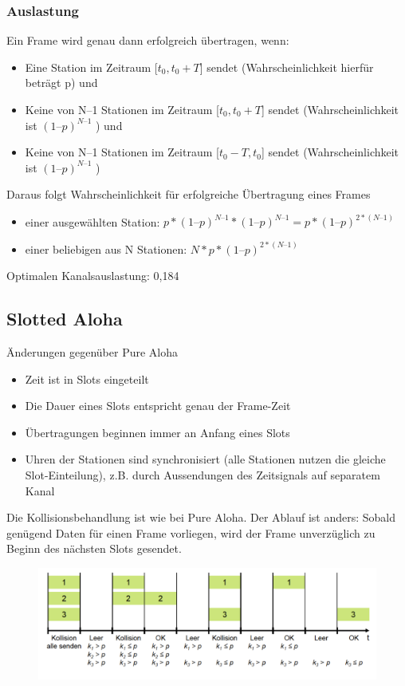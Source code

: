 \documentclass{article} %
\begin{document}
\subsubsection{Auslastung}
Ein Frame wird genau dann erfolgreich übertragen, wenn: 
	\begin{itemize}
	\item Eine Station im Zeitraum [$t_0,t_0+T$] sendet (Wahrscheinlichkeit hierfür beträgt p) und 
	\item Keine von N–1 Stationen im Zeitraum [$t_0,t_0+T$] sendet (Wahrscheinlichkeit ist $(1–p)^{N–1}$ ) und 
	\item Keine von N–1 Stationen im Zeitraum [$t_0-T,t_0$] sendet (Wahrscheinlichkeit ist $(1–p)^{N–1}$ )
	\end{itemize}
Daraus folgt Wahrscheinlichkeit für erfolgreiche Übertragung eines Frames 
	\begin{itemize}
	\item einer ausgewählten Station: $p*(1–p)^{N–1}*(1–p)^{N–1} = p*(1–p)^{2*(N–1)}$
	\item einer beliebigen aus N Stationen: $N*p*(1–p)^{2*(N–1)}$
	\end{itemize}
Optimalen Kanalsauslastung: 0,184


\subsection{Slotted Aloha}
Änderungen gegenüber Pure Aloha
	\begin{itemize}
	\item Zeit ist in Slots eingeteilt 
	\item Die Dauer eines Slots entspricht genau der Frame-Zeit 
	\item Übertragungen beginnen immer an Anfang eines Slots 
	\item Uhren der Stationen sind synchronisiert (alle Stationen nutzen die gleiche Slot-Einteilung), z.B. durch Aussendungen des Zeitsignals auf separatem Kanal 
	\end{itemize}
Die Kollisionsbehandlung ist wie bei Pure Aloha. Der Ablauf ist anders: Sobald genügend Daten für einen Frame vorliegen, wird der Frame unverzüglich zu Beginn des nächsten Slots gesendet.
\begin{figure}[ht]
	\centering
  \includegraphics[width=14cm]{img/slotted1.png}
\end{figure}
\end{document}
